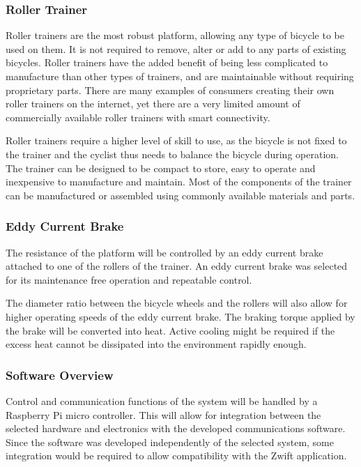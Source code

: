 \subsubsection{Roller Trainer}

Roller trainers are the most robust platform, allowing any type of bicycle to be used on them. It is not required to remove, alter or add to any parts of existing bicycles. Roller trainers have the added benefit of being less complicated to manufacture than other types of trainers, and are maintainable without requiring proprietary parts. There are many examples of consumers creating their own roller trainers on the internet, yet there are a very limited amount of commercially available roller trainers with smart connectivity.

Roller trainers require a higher level of skill to use, as the bicycle is not fixed to the trainer and the cyclist thus needs to balance the bicycle during operation. The trainer can be designed to be compact to store, easy to operate and inexpensive to manufacture and maintain. Most of the components of the trainer can be manufactured or assembled using commonly available materials and parts.

\subsubsection{Eddy Current Brake}

The resistance of the platform will be controlled by an eddy current brake attached to one of the rollers of the trainer. An eddy current brake was selected for its maintenance free operation and repeatable control.

The diameter ratio between the bicycle wheels and the rollers will also allow for higher operating speeds of the eddy current brake. The braking torque applied by the brake will be converted into heat. Active cooling might be required if the excess heat cannot be dissipated into the environment rapidly enough.

\subsubsection{Software Overview}

Control and communication functions of the system will be handled by a Raspberry Pi micro controller. This will allow for integration between the selected hardware and electronics with the developed communications software. Since the software was developed independently of the selected system, some integration would be required to allow compatibility with the Zwift application.

